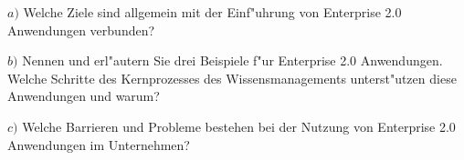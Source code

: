 \noindent
$a)$ Welche Ziele sind allgemein mit der Einf"uhrung von Enterprise 2.0 Anwendungen verbunden?\\
\begin{quote}
\end{quote}

\noindent
$b)$ Nennen und erl"autern Sie drei Beispiele f"ur Enterprise 2.0 Anwendungen.
Welche Schritte des Kernprozesses des Wissensmanagements unterst"utzen diese Anwendungen und warum?\\
\begin{quote}
\end{quote}

\noindent
$c)$ Welche Barrieren und Probleme bestehen bei der Nutzung von Enterprise 2.0 Anwendungen im Unternehmen?

\begin{quote}
\end{quote}









